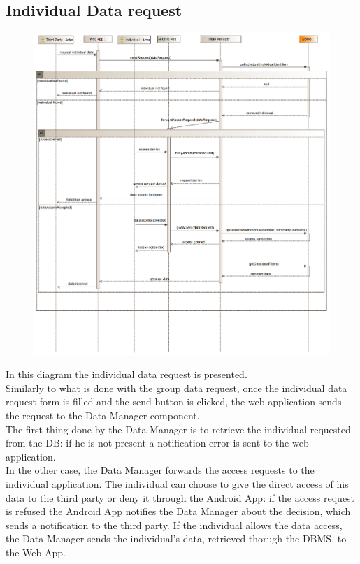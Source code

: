 \subsection{Individual Data request}
\begin{figure}[H]
\centering
\includegraphics[width=\linewidth]{resources/uml/sequence/RequestIndividualData.png}
\end{figure}
In this diagram the individual data request is presented.\\
Similarly to what is done with the group data request, once the individual data request form is filled and the send button is clicked, the web application sends the request to the Data Manager component.\\
The first thing done by the Data Manager is to retrieve the individual requested from the DB: if he is not present a notification error is sent to the web application.\\
In the other case, the Data Manager forwards the access requests to the individual application.
The individual can choose to give the direct access of his data to the third party or deny it through the Android App: if the access request is refused the Android App notifies the Data Manager about the decision, which sends a notification to the third party.
If the individual allows the data access, the Data Manager sends the individual's data, retrieved thorugh the DBMS, to the Web App.


